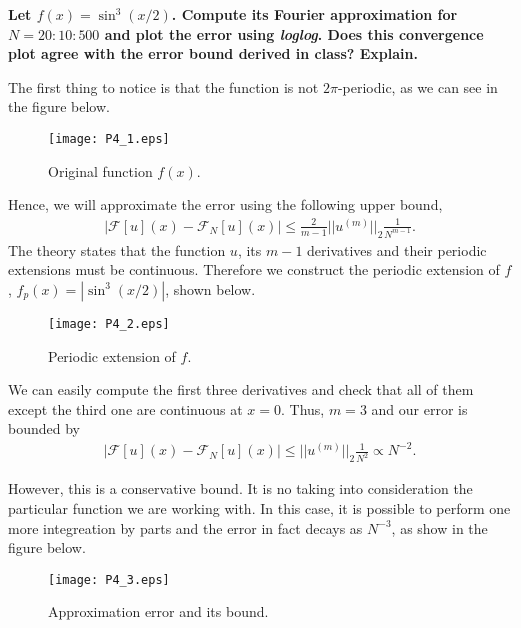 \textbf{Let $f(x)=\sin^3(x/2)$. Compute its Fourier approximation for $N = 20 : 10 : 500$ and plot the error using \textsl{loglog}. Does this convergence plot agree with the error bound derived in class? Explain.}
\newline

The first thing to notice is that the function is not $2\pi$-periodic, as we can see in the figure below.

\begin{figure}[H]
\centering     %
{\texttt{[image: P4\_1.eps]}}
\caption{Original function $f(x)$.}
\end{figure}

Hence, we will approximate the error using the following upper bound,
\begin{align*}
\left|\mathcal{F}[u](x)-\mathcal{F}_N[u](x)\right|\leq \frac{2}{m-1}||u^{(m)}||_2\frac{1}{N^{m-1}}.
\end{align*}
The theory states that the function $u$, its $m-1$ derivatives and their periodic extensions must be continuous. Therefore we construct the periodic extension of $f$, $f_p(x) = |\sin^3(x/2)|$, shown below.

\begin{figure}[H]
\centering     %
{\texttt{[image: P4\_2.eps]}}
\caption{Periodic extension of $f$.}
\end{figure}

We can easily compute the first three derivatives and check that all of them except the third one are continuous at $x=0$. Thus, $m=3$ and our error is bounded by
\begin{align*}
\left|\mathcal{F}[u](x)-\mathcal{F}_N[u](x)\right|\leq ||u^{(m)}||_2\frac{1}{N^2}\propto N^{-2}.
\end{align*}

However, this is a conservative bound. It is no taking into consideration the particular function we are working with. In this case, it is possible to perform one more integreation by parts and the error in fact decays as $N^{-3}$, as show in the figure below.

\begin{figure}[H]
\centering     %
{\texttt{[image: P4\_3.eps]}}
\caption{Approximation error and its bound.}
\end{figure}

